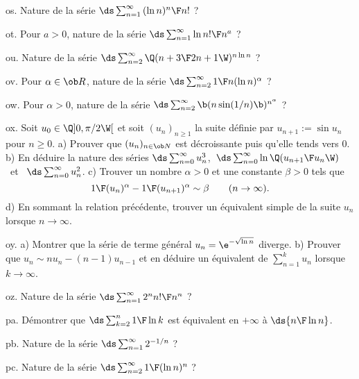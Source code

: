 \exo [Level=2,Fight=0,Learn=0,Type=\Exercices,Field=\Séries,Origin=] os. 
Nature de la série $\ds\sum_{n=1}^\infty {(\ln n)^n\F n!}$ ?

\exo [Level=2,Fight=0,Learn=0,Type=\Exercices,Field=\Séries,Origin=] ot. 
Pour $a>0$, nature de la série $\ds\sum_{n=1}^\infty {\ln n!\F n^a}$ ?

\exo [Level=2,Fight=0,Learn=0,Type=\Exercices,Field=\Séries,Origin=] ou. 
Nature de la série $\ds\sum_{n=2}^\infty \Q({n+3\F2n+1}\W)^{n\ln n}$ ?

\exo [Level=2,Fight=0,Learn=0,Type=\Exercices,Field=\Séries,Origin=] ov. 
Pour $\alpha\in\ob R$, nature de la série $\ds\sum_{n=2}^\infty{1\F n(\ln n)^\alpha}$ ? 

\exo [Level=2,Fight=0,Learn=0,Type=\Exercices,Field=\Séries,Origin=] ow. 
Pour $\alpha>0$, nature de la série $\ds\sum_{n=2}^\infty\b(n\sin(1/n)\b)^{n^\alpha}$ ?

\exo [Level=1,Fight=2,Learn=2,Type=\Exercices,Field=\Suites,Origin=] ox. 
Soit $u_0\in\Q]0,\pi/2\W[$ et soit $(u_n)_{n\ge1}$ la suite définie par $u_{n+1}:=\sin u_n$ pour $n\ge0$. \pn 
a) Prouver que $(u_n)_{n\in\ob N}$ est décroissante puis qu'elle tends vers $0$. \pn
b) En déduire la nature des séries $\ds\sum_{n=0}^\infty u_n^3$,\ 
$\ds\sum_{n=0}^\infty\ln\Q({u_{n+1}\F u_n}\W)$ \  et \ $\ds\sum_{n=0}^\infty u_n^2$. \pn
c) Trouver un nombre $\alpha>0$ et une constante $\beta>0$ tels que 
$$
{1\F(u_n)^\alpha}-{1\F(u_{n+1})^\alpha}\sim\beta\qquad(n\to\infty).
$$
d) En sommant la relation précédente, 
trouver un équivalent simple de la suite $u_n$ lorsque $n\to\infty$. 

\exo [Level=2,Fight=2,Learn=2,Type=\Exercices,Field=\SériesNumériques,Origin=] oy. 
a) Montrer que la série de terme général $u_n=\e^{-\sqrt{\ln n}}$ diverge. \pn
b) Prouver que $u_n\sim nu_n-(n-1)u_{n-1}$ et en déduire un équivalent 
de $\sum_{n=1}^ku_n$ lorsque $k\to\infty$. 

\exo [Level=2,Fight=0,Learn=0,Type=\Exercices,Field=\SériesNumériques,Origin=] oz. 
Nature de la série $\ds\sum_{n=1}^\infty {2^nn!\F n^n}$ ?

\exo [Level=2,Fight=0,Learn=0,Type=\Exercices,Field=\SériesNumériques,Origin=] pa. 
Démontrer que $\ds\sum_{k=2}^n{1\F\ln k}$ est équivalent en $+\infty$ à $\ds{n\F\ln n}$. 

\exo [Level=2,Fight=0,Learn=0,Type=\Exercices,Field=\SériesNumériques,Origin=] pb. 
Nature de la série $\ds\sum_{n=1}^\infty2^{-1/n}$ ? 

\exo [Level=2,Fight=0,Learn=0,Type=\Exercices,Field=\SériesNumériques,Origin=] pc. 
Nature de la série $\ds\sum_{n=2}^\infty{1\F(\ln n)^n}$ ?

